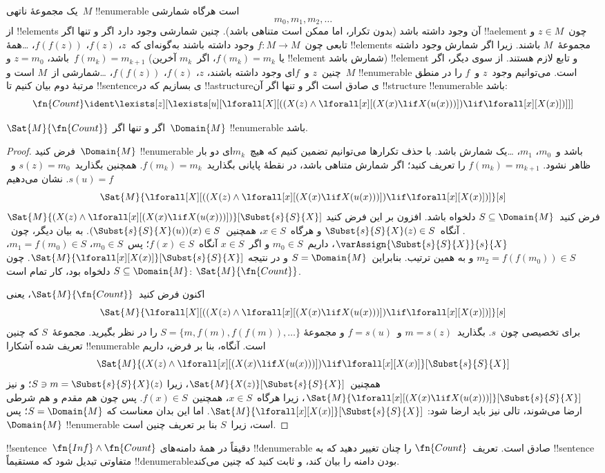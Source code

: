 \documentclass[../../../include/open-logic-section]{subfiles}
\begin{document}
یک مجموعهٔ ناتهی~$M$ !!{enumerable} است هرگاه شمارشی
\[
m_0, m_1, m_2, \dots
\]
از !!{element}s آن وجود داشته باشد (بدون تکرار، اما ممکن است متناهی
باشد). چنین شمارشی وجود دارد اگر و تنها اگر !!a{element} چون~$z \in M$
و تابعی چون~$f\colon M \to M$ وجود داشته باشند به‌گونه‌ای که~$z$،
$f(z)$، $f(f(z))$، \dots همهٔ !!{element}s مجموعهٔ~$M$ باشند. زیرا اگر
شمارش وجود داشته باشد، $z = m_0$ و~$f(m_k) = m_{k+1}$ (یا
$f(m_k) = m_k$، اگر~$m_k$ آخرین !!{element} شمارش باشد) !!{element} و تابع لازم
هستند. از سوی دیگر، اگر چنین~$z$ و~$f$ای وجود داشته باشند، $z$،
$f(z)$، $f(f(z))$، \dots شمارشی از~$M$ است و~$M$ !!{enumerable} است.
می‌توانیم وجود~$z$ و~$f$ را در منطق مرتبهٔ دوم بیان کنیم تا
!!{sentence}ی بسازیم که در !!a{structure}ی صادق است اگر و تنها اگر آن
!!{structure} !!{enumerable} باشد:
\[
\fn{Count} \ident
\lexists[z][\lexists[u][\lforall[X][((X(z) \land
      \lforall[x][(X(x) \lif X(u(x)))]) \lif \lforall[x][X(x)])]]]
\]

\begin{prop}
$\Sat{M}{\fn{Count}}$ اگر و تنها اگر~$\Domain{M}$ !!{enumerable} باشد.
\end{prop}

\begin{proof}
فرض کنید~$\Domain{M}$ !!{enumerable} باشد و~$m_0$، $m_1$، \dots یک
شمارش باشد. با حذف تکرارها می‌توانیم تضمین کنیم که هیچ~$m_k$ای دو بار
ظاهر نشود. $f(m_k) = m_{k+1}$ را تعریف کنید؛ اگر شمارش متناهی باشد،
در نقطهٔ پایانی بگذارید~$f(m_k) = m_k$. همچنین بگذارید~$s(z) = m_0$
و~$s(u) = f$. نشان می‌دهیم
\[
\Sat{M}{\lforall[X][((X(z) \land \lforall[x][(X(x) \lif X(u(x)))])
    \lif \lforall[x][X(x)])]}[s]
\]
فرض کنید~$S \subseteq \Domain{M}$ دلخواه باشد. افزون بر این فرض کنید
$\Sat{M}{(X(z) \land \lforall[x][(X(x) \lif
X(u(x)))])}[\Subst{s}{S}{X}]$. آنگاه~$\Subst{s}{S}{X}(z) \in S$ و
هرگاه~$x \in S$، همچنین~$(\Subst{s}{S}{X}(u))(x) \in S$. به بیان
دیگر، چون~$\varAssign{\Subst{s}{S}{X}}{s}{X}$، داریم~$m_0 \in S$ و
اگر~$x \in S$ آنگاه~$f(x) \in S$؛ پس~$m_0 \in S$،
$m_1 = f(m_0) \in S$، $m_2 = f(f(m_0)) \in S$ و به همین ترتیب.
بنابراین~$S = \Domain{M}$ و در نتیجه
$\Sat{M}{\lforall[x][X(x)]}[\Subst{s}{S}{X}]$. چون
$S \subseteq \Domain{M}$ دلخواه بود، کار تمام است:
$\Sat{M}{\fn{Count}}$.

اکنون فرض کنید~$\Sat{M}{\fn{Count}}$، یعنی
\[
\Sat{M}{\lforall[X][((X(z) \land \lforall[x][(X(x) \lif X(u(x)))])
    \lif \lforall[x][X(x)])]}[s]
\]
برای تخصیصی چون~$s$. بگذارید~$m = s(z)$ و~$f = s(u)$ و مجموعهٔ
$S = \{m, f(m), f(f(m)), \dots\}$ را در نظر بگیرید. مجموعهٔ~$S$ که
چنین تعریف شده آشکارا !!{enumerable} است. آنگاه، بنا بر فرض، داریم
\[
\Sat{M}{(X(z) \land \lforall[x][(X(x) \lif X(u(x)))])
    \lif \lforall[x][X(x)]}[\Subst{s}{S}{X}]
\]
همچنین~$\Sat{M}{X(z)}[\Subst{s}{S}{X}]$، زیرا
$S \ni m = \Subst{s}{S}{X}(z)$؛ و نیز
$\Sat{M}{\lforall[x][(X(x) \lif X(u(x)))]}[\Subst{s}{S}{X}]$، زیرا
هرگاه~$x \in S$، همچنین~$f(x) \in S$. پس چون هم مقدم و هم شرطی ارضا
می‌شوند، تالی نیز باید ارضا شود:
$\Sat{M}{\lforall[x][X(x)]}[\Subst{s}{S}{X}]$. اما این بدان معناست که
$S = \Domain{M}$؛ پس~$\Domain{M}$ !!{enumerable} است، زیرا~$S$ بنا بر
تعریف چنین است.
\end{proof}

\begin{prob}
!!{sentence}~$\fn{Inf} \land \fn{Count}$ دقیقاً در همهٔ دامنه‌های
!!{denumerable} صادق است. تعریف~$\fn{Count}$ را چنان تغییر دهید که به
!!{sentence} متفاوتی تبدیل شود که مستقیماً !!{denumerable}بودن دامنه را
بیان کند، و ثابت کنید که چنین می‌کند.
\end{prob}
\end{document}
